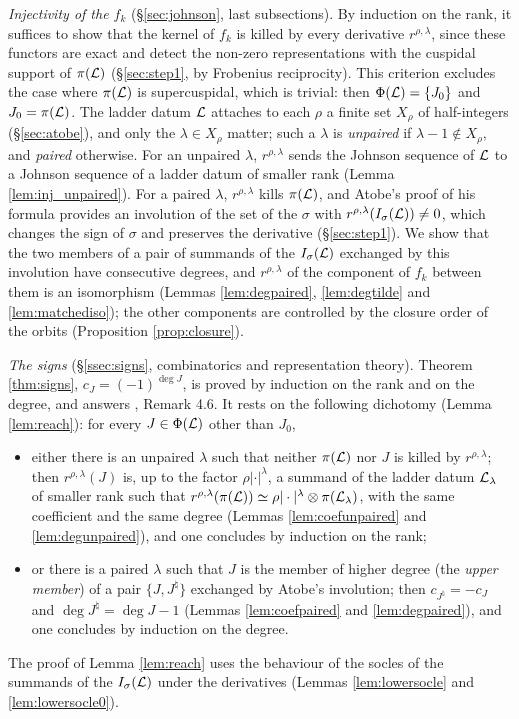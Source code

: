 \documentclass[a4paper,12pt,leqno]{amsart}
\theoremstyle{plain}
\theoremstyle{definition}
\begin{document}
\emph{Injectivity of the $f_k$} (\S\ref{sec:johnson}, last subsections). By induction on the rank, it
suffices to show that the kernel of $f_k$ is killed by every derivative $r^{\rho,\lambda}$, since these
functors are exact and detect the non-zero representations with the cuspidal support of $\pi(\mathcal{L})$
(\S\ref{sec:step1}, by Frobenius reciprocity). This criterion excludes the case where $\pi(\mathcal{L})$ is
supercuspidal, which is trivial: then $\Phi(\mathcal{L})=\{J_0\}$ and $J_0=\pi(\mathcal{L})$.
The ladder datum $\mathcal{L}$ attaches to each $\rho$ a finite
set $X_\rho$ of half-integers (\S\ref{sec:atobe}), and only the $\lambda\in X_\rho$ matter; such a
$\lambda$ is \emph{unpaired} if $\lambda-1\notin X_\rho$, and \emph{paired} otherwise. For an unpaired
$\lambda$, $r^{\rho,\lambda}$ sends the Johnson sequence of $\mathcal{L}$ to a Johnson sequence of a ladder
datum of smaller rank (Lemma \ref{lem:inj_unpaired}). For a paired $\lambda$, $r^{\rho,\lambda}$ kills
$\pi(\mathcal{L})$, and Atobe's proof of his formula provides an involution of the set of the $\sigma$ with
$r^{\rho,\lambda}(I_\sigma(\mathcal{L}))\neq0$, which changes the sign of $\sigma$ and preserves the derivative
(\S\ref{sec:step1}). We show that the two members of a pair of summands of the $I_\sigma(\mathcal{L})$ exchanged by this involution have
consecutive degrees, and $r^{\rho,\lambda}$ of the component of $f_k$
between them is an isomorphism (Lemmas \ref{lem:degpaired}, \ref{lem:degtilde} and
\ref{lem:matchediso}); the other components are controlled by the closure order of the orbits
(Proposition \ref{prop:closure}).

\emph{The signs} (\S\ref{ssec:signs}, combinatorics and representation theory).
Theorem \ref{thm:signs}, $c_J=(-1)^{\deg J}$, is proved by induction on the rank and on the degree,
and answers \cite{Ato24}, Remark 4.6. It rests on the following dichotomy
(Lemma \ref{lem:reach}): for every $J\in\Phi(\mathcal{L})$ other than $J_0$,
\begin{itemize}
\item either there is an unpaired $\lambda$ such that neither $\pi(\mathcal{L})$ nor $J$ is killed by
$r^{\rho,\lambda}$; then $r^{\rho,\lambda}(J)$ is, up to the factor $\rho|\cdot|^\lambda$, a summand of the
ladder datum $\mathcal{L}_\lambda$ of smaller rank such that $r^{\rho,\lambda}(\pi(\mathcal{L}))\simeq
\rho|\cdot|^\lambda\otimes\pi(\mathcal{L}_\lambda)$, with the same coefficient and the same degree (Lemmas
\ref{lem:coefunpaired} and \ref{lem:degunpaired}), and one concludes by induction on the rank;
\item or there is a paired $\lambda$ such that $J$ is the member of higher degree (the \emph{upper member}) of a pair $\{J,J^\natural\}$
exchanged by Atobe's involution; then $c_{J^\natural}=-c_J$ and $\deg J^\natural=\deg J-1$ (Lemmas
\ref{lem:coefpaired} and \ref{lem:degpaired}), and one concludes by induction on the degree.
\end{itemize} The proof of
Lemma \ref{lem:reach} uses the behaviour of the socles of the summands of the $I_\sigma(\mathcal{L})$ under the derivatives (Lemmas
\ref{lem:lowersocle} and \ref{lem:lowersocle0}).
\end{document}
